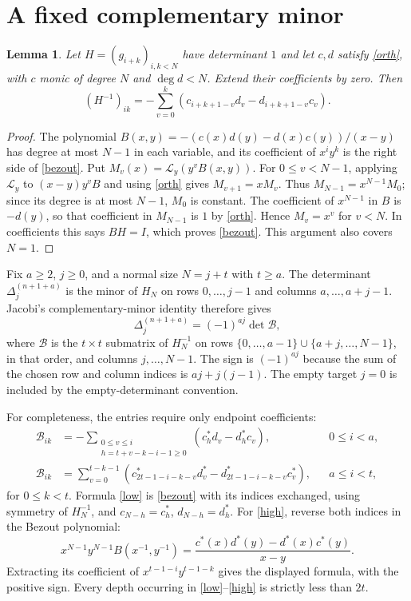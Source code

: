 \documentclass[11pt,a4paper]{article}
\newcommand{\D}[2]{\Delta_{#1}^{(#2)}}
\newtheorem{lemma}[theorem]{Lemma}
\begin{document}
\section{A fixed complementary minor}
\begin{lemma}\label{inverse}
Let $H=(g_{i+k})_{i,k<N}$ have determinant $1$ and let $c,d$ satisfy
\eqref{orth}, with $c$ monic of degree $N$ and $\deg d<N$.
Extend their coefficients by zero. Then
\begin{equation}\label{bezout}
 (H^{-1})_{ik}=-\sum_{v=0}^{k}
 (c_{i+k+1-v}d_v-d_{i+k+1-v}c_v).
\end{equation}
\end{lemma}
\begin{proof}
The polynomial $B(x,y)=-(c(x)d(y)-d(x)c(y))/(x-y)$ has degree at
most $N-1$ in each variable, and its coefficient of $x^iy^k$ is the
right side of \eqref{bezout}. Put $M_v(x)=\mathcal L_y(y^vB(x,y))$.
For $0\le v<N-1$, applying $\mathcal L_y$ to
$(x-y)y^vB$ and using \eqref{orth} gives $M_{v+1}=xM_v$.
Thus $M_{N-1}=x^{N-1}M_0$; since its degree is at most $N-1$,
$M_0$ is constant. The coefficient of $x^{N-1}$ in $B$ is $-d(y)$,
so that coefficient in $M_{N-1}$ is $1$ by \eqref{orth}.
Hence $M_v=x^v$ for $v<N$. In coefficients this says $BH=I$,
which proves \eqref{bezout}. This argument also covers $N=1$.
\end{proof}

Fix $a\ge2$, $j\ge0$, and a normal size $N=j+t$ with $t\ge a$.
The determinant $\D j{n+1+a}$ is the minor of $H_N$ on rows
$0,\ldots,j-1$ and columns $a,\ldots,a+j-1$.
Jacobi's complementary-minor identity therefore gives
\begin{equation}\label{jacobi}
 \D j{n+1+a}=(-1)^{aj}\det\mathcal B,
\end{equation}
where $\mathcal B$ is the $t\times t$ submatrix of $H_N^{-1}$ on
rows $\{0,\ldots,a-1\}\cup\{a+j,\ldots,N-1\}$, in that order,
and columns $j,\ldots,N-1$. The sign is $(-1)^{aj}$ because the
sum of the chosen row and column indices is $aj+j(j-1)$.
The empty target $j=0$ is included by the empty-determinant convention.

For completeness, the entries require only endpoint coefficients:
\begin{align}
 \mathcal B_{ik}
 &=-\sum_{\substack{0\le v\le i\\h=t+v-k-i-1\ge0}}
     (c^*_h d_v-d^*_h c_v), &&0\le i<a,\label{low}\\
 \mathcal B_{ik}
 &=\sum_{v=0}^{t-k-1}
   (c^*_{2t-1-i-k-v}d^*_v-d^*_{2t-1-i-k-v}c^*_v),
     &&a\le i<t,\label{high}
\end{align}
for $0\le k<t$. Formula \eqref{low} is \eqref{bezout} with its
indices exchanged, using symmetry of $H_N^{-1}$, and
$c_{N-h}=c_h^*$, $d_{N-h}=d_h^*$.
For \eqref{high}, reverse both indices in the Bezout polynomial:
\[
 x^{N-1}y^{N-1}B(x^{-1},y^{-1})
 =\frac{c^*(x)d^*(y)-d^*(x)c^*(y)}{x-y}.
\]
Extracting its coefficient of $x^{t-1-i}y^{t-1-k}$ gives the displayed
formula, with the positive sign. Every depth occurring in
\eqref{low}--\eqref{high} is strictly less than $2t$.
\end{document}

